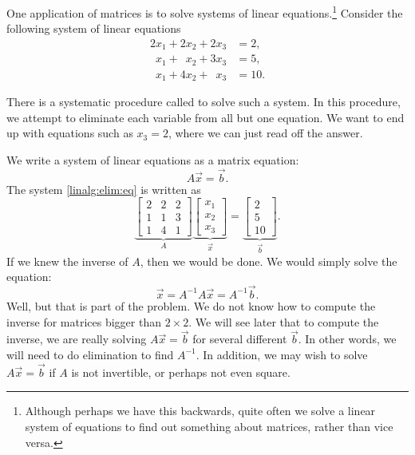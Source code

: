 One application of matrices is to solve systems of
linear equations.\footnote{Although perhaps we have this backwards,
quite often we solve a linear system of equations
to find out something about matrices, rather than vice versa.}
Consider the following system of linear equations
\begin{equation} \label{linalg:elim:eq}
\begin{aligned}
          2 x_1 +           2 x_2 +           2 x_3 & = 2 , \\
\phantom{9} x_1 + \phantom{9} x_2 +           3 x_3 & = 5 , \\
\phantom{9} x_1 +           4 x_2 + \phantom{9} x_3 & = 10 .
\end{aligned}
\end{equation}

There is a systematic procedure
called \emph{} to solve such a system.
In this procedure,
we attempt to eliminate each variable from all but one equation.
We want to end up with equations
such as $x_3 = 2$, where we can just read off the answer.

We write a system of linear equations as a matrix equation:
\begin{equation*}
A \vec{x} = \vec{b} .
\end{equation*}
The system \eqref{linalg:elim:eq} is written as
\begin{equation*}
\underbrace{
\begin{bmatrix}
2 & 2 & 2 \\
1 & 1 & 3 \\
1 & 4 & 1
\end{bmatrix}
}_{A}
\underbrace{
\begin{bmatrix}
x_1 \\
x_2 \\
x_3
\end{bmatrix}
}_{\vec{x}}
=
\underbrace{
\begin{bmatrix}
2 \\
5 \\
10
\end{bmatrix}
}_{\vec{b}} .
\end{equation*}
If we knew the inverse of $A$, then we would be done.
We would simply solve
the equation:
\begin{equation*}
\vec{x} = A^{-1} A \vec{x} = A^{-1} \vec{b} .
\end{equation*}
Well, but that is part of the problem.
We do not know how to compute the
inverse for matrices bigger than $2 \times 2$.
We will see later that to compute the inverse, we are really solving
$A \vec{x} = \vec{b}$ for several different $\vec{b}$.  In other words,
we will need to do elimination to find $A^{-1}$.
In addition, we may wish to solve $A \vec{x} = \vec{b}$
if $A$ is not invertible, or perhaps not even square.

